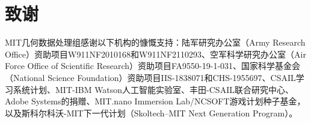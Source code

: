 \section{致谢}

MIT几何数据处理组感谢以下机构的慷慨支持：陆军研究办公室（Army Research Office）资助项目W911NF2010168和W911NF2110293、空军科学研究办公室（Air Force Office of Scientific Research）资助项目FA9550-19-1-031、国家科学基金会（National Science Foundation）资助项目IIS-1838071和CHS-1955697、CSAIL学习系统计划、MIT-IBM Watson人工智能实验室、丰田-CSAIL联合研究中心、Adobe Systems的捐赠、MIT.nano Immersion Lab/NCSOFT游戏计划种子基金，以及斯科尔科沃-MIT下一代计划（Skoltech--MIT Next Generation Program）。 